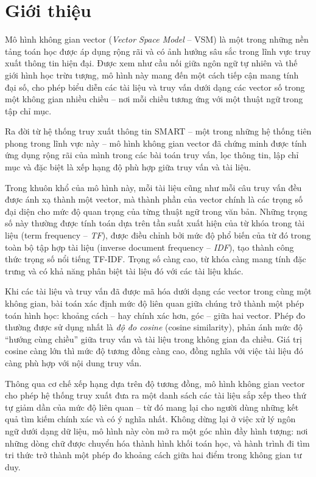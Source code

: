 \section{Giới thiệu}
Mô hình không gian vector (\textit{Vector Space Model} -- VSM) \cite{singh2022vectorspacemodel} là một trong những nền tảng toán học được áp dụng rộng rãi và có ảnh hưởng sâu sắc trong lĩnh vực truy xuất thông tin hiện đại. Được xem như cầu nối giữa ngôn ngữ tự nhiên và thế giới hình học trừu tượng, mô hình này mang đến một cách tiếp cận mang tính đại số, cho phép biểu diễn các tài liệu và truy vấn dưới dạng các vector số trong một không gian nhiều chiều -- nơi mỗi chiều tương ứng với một thuật ngữ trong tập chỉ mục.

Ra đời từ hệ thống truy xuất thông tin SMART \cite{buckley_salton_allan1993smart} -- một trong những hệ thống tiên phong trong lĩnh vực này -- mô hình không gian vector đã chứng minh được tính ứng dụng rộng rãi của mình trong các bài toán truy vấn, lọc thông tin, lập chỉ mục và đặc biệt là xếp hạng độ phù hợp giữa truy vấn và tài liệu.

Trong khuôn khổ của mô hình này, mỗi tài liệu cũng như mỗi câu truy vấn đều được ánh xạ thành một vector, mà thành phần của vector chính là các trọng số đại diện cho mức độ quan trọng của từng thuật ngữ trong văn bản. Những trọng số này thường được tính toán dựa trên tần suất xuất hiện của từ khóa trong tài liệu (term frequency -- \textit{TF}), được điều chỉnh bởi mức độ phổ biến của từ đó trong toàn bộ tập hợp tài liệu (inverse document frequency -- \textit{IDF}), tạo thành công thức trọng số nổi tiếng TF-IDF. Trọng số càng cao, từ khóa càng mang tính đặc trưng và có khả năng phân biệt tài liệu đó với các tài liệu khác.

Khi các tài liệu và truy vấn đã được mã hóa dưới dạng các vector trong cùng một không gian, bài toán xác định mức độ liên quan giữa chúng trở thành một phép toán hình học: khoảng cách -- hay chính xác hơn, góc -- giữa hai vector. Phép đo thường được sử dụng nhất là \textit{độ đo cosine} (cosine similarity), phản ánh mức độ ``hướng cùng chiều'' giữa truy vấn và tài liệu trong không gian đa chiều. Giá trị cosine càng lớn thì mức độ tương đồng càng cao, đồng nghĩa với việc tài liệu đó càng phù hợp với nội dung truy vấn.

Thông qua cơ chế xếp hạng dựa trên độ tương đồng, mô hình không gian vector cho phép hệ thống truy xuất đưa ra một danh sách các tài liệu sắp xếp theo thứ tự giảm dần của mức độ liên quan -- từ đó mang lại cho người dùng những kết quả tìm kiếm chính xác và có ý nghĩa nhất. Không dừng lại ở việc xử lý ngôn ngữ dưới dạng dữ liệu, mô hình này còn mở ra một góc nhìn đầy hình tượng: nơi những dòng chữ được chuyển hóa thành hình khối toán học, và hành trình đi tìm tri thức trở thành một phép đo khoảng cách giữa hai điểm trong không gian tư duy.
